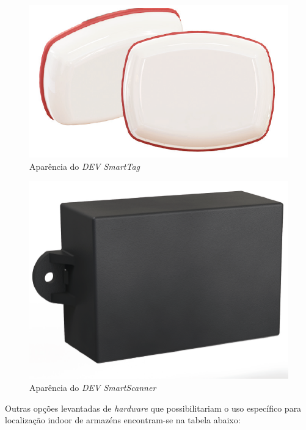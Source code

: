 \begin{figure}[H]
	\centering
	\includegraphics[scale = 1]{images/dev_tag.png}
	\caption{Aparência do \textit{DEV SmartTag}}
	\label{fig:dev_smart_tag}
\end{figure}

\begin{figure}[H]
	\centering
	\includegraphics[scale = 1]{images/dev_scanner.png}
	\caption{Aparência do \textit{DEV SmartScanner}}
	\label{fig:dev_smart_scanner}
\end{figure}

Outras opções levantadas de \textit{hardware} que possibilitariam o uso específico para localização indoor de armazéns encontram-se na tabela abaixo:

